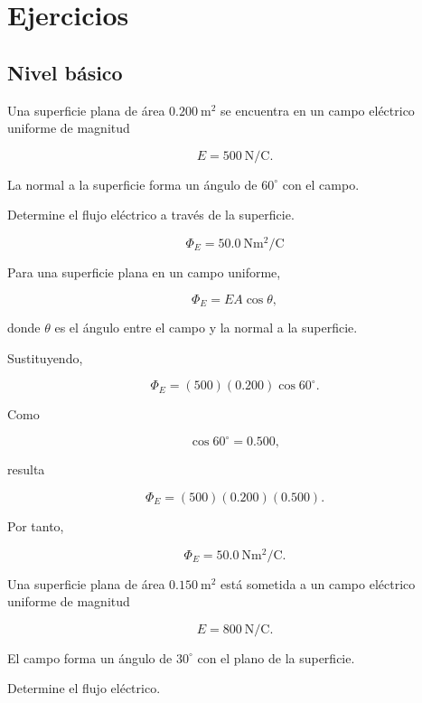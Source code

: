\section{Ejercicios}

\subsection{Nivel básico}

\begin{ejercicio}

Una superficie plana de área \(\SI{0.200}{\metre\squared}\) se encuentra en un
campo eléctrico uniforme de magnitud

\[
E=\SI{500}{\newton\per\coulomb}.
\]

La normal a la superficie forma un ángulo de \(60^\circ\) con el campo.

Determine el flujo eléctrico a través de la superficie.

\end{ejercicio}

\begin{respuesta}

\[
\boxed{\Phi_E=\SI{50.0}{\newton\metre\squared\per\coulomb}}
\]

\end{respuesta}

\begin{explicacion}

Para una superficie plana en un campo uniforme,

\[
\Phi_E=EA\cos\theta,
\]

donde \(\theta\) es el ángulo entre el campo y la normal a la superficie.

Sustituyendo,

\[
\Phi_E=(500)(0.200)\cos60^\circ.
\]

Como

\[
\cos60^\circ=0.500,
\]

resulta

\[
\Phi_E=(500)(0.200)(0.500).
\]

Por tanto,

\[
\boxed{\Phi_E=\SI{50.0}{\newton\metre\squared\per\coulomb}}.
\]

\end{explicacion}


\begin{ejercicio}

Una superficie plana de área \(\SI{0.150}{\metre\squared}\) está sometida a un
campo eléctrico uniforme de magnitud

\[
E=\SI{800}{\newton\per\coulomb}.
\]

El campo forma un ángulo de \(30^\circ\) con el plano de la superficie.

Determine el flujo eléctrico.

\end{ejercicio}

